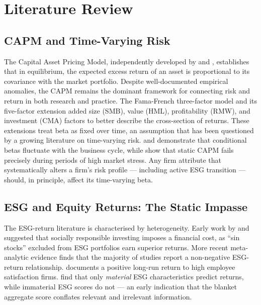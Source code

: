 \chapter{Literature Review}
\label{chap:literature}

\section{CAPM and Time-Varying Risk}

The Capital Asset Pricing Model, independently developed by \citet{sharpe1964capital} and \citet{lintner1965valuation}, establishes that in equilibrium, the expected excess return of an asset is proportional to its covariance with the market portfolio. Despite well-documented empirical anomalies, the CAPM remains the dominant framework for connecting risk and return in both research and practice. The Fama-French three-factor model \citep{fama1993common} and its five-factor extension \citep{fama2015five} added size (SMB), value (HML), profitability (RMW), and investment (CMA) factors to better describe the cross-section of returns. These extensions treat beta as fixed over time, an assumption that has been questioned by a growing literature on time-varying risk. \citet{harvey1989time} and \citet{ferson1996measuring} demonstrate that conditional betas fluctuate with the business cycle, while \citet{ang2007capm} show that static CAPM fails precisely during periods of high market stress. Any firm attribute that systematically alters a firm's risk profile --- including active ESG transition --- should, in principle, affect its time-varying beta.

\section{ESG and Equity Returns: The Static Impasse}

The ESG-return literature is characterised by heterogeneity. Early work by \citet{renneboog2008socially} and \citet{hong2009price} suggested that socially responsible investing imposes a financial cost, as ``sin stocks'' excluded from ESG portfolios earn superior returns. More recent meta-analytic evidence \citep{friede2015esg} finds that the majority of studies report a non-negative ESG-return relationship. \citet{edmans2011does} documents a positive long-run return to high employee satisfaction firms. \citet{khan2016corporate} find that only \emph{material} ESG characteristics predict returns, while immaterial ESG scores do not --- an early indication that the blanket aggregate score conflates relevant and irrelevant information.

